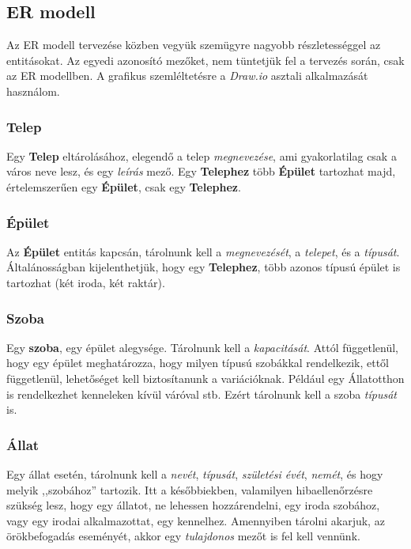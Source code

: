 \documentclass[a4paper,12pt]{article}
\begin{document}
\subsection{ER modell}
Az ER modell tervezése közben vegyük szemügyre nagyobb részletességgel az entitásokat. Az egyedi azonosító mezőket, nem tüntetjük fel a tervezés során, csak az ER modellben. A grafikus szemléltetésre a \textit{Draw.io} asztali alkalmazását használom.

\subsubsection*{Telep}
Egy \textbf{Telep} eltárolásához, elegendő a telep \textit{megnevezése}, ami gyakorlatilag csak a város neve lesz, és egy \textit{leírás} mező. Egy \textbf{Telephez} több \textbf{Épület} tartozhat majd, értelemszerűen egy \textbf{Épület}, csak egy \textbf{Telephez}.

\subsubsection*{Épület}

Az \textbf{Épület} entitás kapcsán, tárolnunk kell a \textit{megnevezését}, a \textit{telepet}, és a \textit{típusát}. Általánosságban kijelenthetjük, hogy egy \textbf{Telephez}, több azonos típusú épület is tartozhat (két iroda, két raktár).

\subsubsection*{Szoba}

Egy \textbf{szoba}, egy épület alegysége. Tárolnunk kell a \textit{kapacitását}. Attól függetlenül, hogy egy épület meghatározza, hogy milyen típusú szobákkal rendelkezik, ettől függetlenül, lehetőséget kell biztosítanunk a variációknak. Például egy Állatotthon is rendelkezhet kenneleken kívül váróval stb. Ezért tárolnunk kell a szoba \textit{típusát} is.

\subsubsection*{Állat}
Egy állat esetén, tárolnunk kell a \textit{nevét}, \textit{típusát}, \textit{születési évét}, \textit{nemét}, és hogy melyik ,,szobához'' tartozik. Itt a későbbiekben, valamilyen hibaellenőrzésre szükség lesz, hogy egy állatot, ne lehessen hozzárendelni, egy iroda szobához, vagy egy irodai alkalmazottat, egy kennelhez. Amennyiben tárolni akarjuk, az örökbefogadás eseményét, akkor egy \textit{tulajdonos} mezőt is fel kell vennünk.
\end{document}
